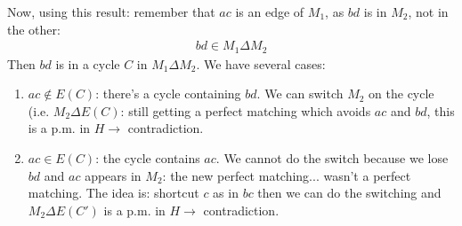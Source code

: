 			Now, using this result: remember that $ac$ is an edge of $M_1$, as $bd$ is in $M_2$, not in the other:
			\begin{eqnarray}
				bd \in M_1 \Delta M_2
			\end{eqnarray}
			Then $bd$ is in a cycle $C$ in $M_1 \Delta M_2$.
			We have several cases:
			\begin{enumerate}
				\item $ac \notin E(C)$: there's a cycle containing $bd$. We can switch $M_2$ on the cycle (i.e. $M_2 \Delta E(C)$: still getting a perfect matching which avoids $ac$ and $bd$, this is a p.m. in $H \longrightarrow $ contradiction.
				\item $ac \in E(C)$: the cycle contains $ac$. We cannot do the switch because we lose $bd$ and $ac$ appears in $M_2$: the new perfect matching... wasn't a perfect matching. The idea is: shortcut $c$ as in $bc$ then we can do the switching and $M_2 \Delta E(C')$ is a p.m. in $H \longrightarrow$ contradiction.
			\end{enumerate}
			

